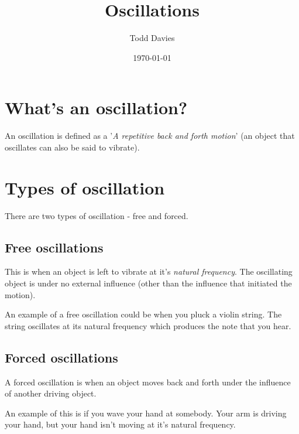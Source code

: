 \documentclass{article}
\title{Oscillations}
\author{Todd Davies}
\date{\today}
\begin{document}
\lhead{\today}

\maketitle

\section*{What's an oscillation?}
\thispagestyle{empty}
An oscillation is defined as a '\textit{A repetitive back and forth motion}' (an object that oscillates can also be said to vibrate).

\section*{Types of oscillation}
There are two types of oscillation - free and forced.
\subsection*{Free oscillations}
This is when an object is left to vibrate at it's \textit{natural frequency}. The oscillating object is under no external influence (other than the influence that initiated the motion). 

An example of a free oscillation could be when you pluck a violin string. The string oscillates at its natural frequency which produces the note that you hear.
\subsection*{Forced oscillations}
A forced oscillation is when an object moves back and forth under the influence of another driving object.

An example of this is if you wave your hand at somebody. Your arm is driving your hand, but your hand isn't moving at it's natural frequency.
\end{document}
